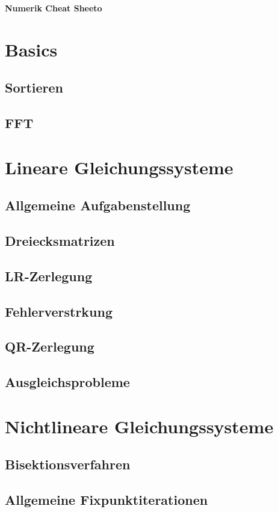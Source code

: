 \begin{center}
     \Large{\textbf{Numerik Cheat Sheeto}} \\
\end{center}

\section{Basics}
\subsection{Sortieren}
\subsection{FFT}

\section{Lineare Gleichungssysteme}
\subsection{Allgemeine Aufgabenstellung}
\subsection{Dreiecksmatrizen}
\subsection{LR-Zerlegung}
\subsection{Fehlerverst\a rkung}
\subsection{QR-Zerlegung}
\subsection{Ausgleichsprobleme}


\section{Nichtlineare Gleichungssysteme}
\subsection{Bisektionsverfahren}
\subsection{Allgemeine Fixpunktiterationen}
